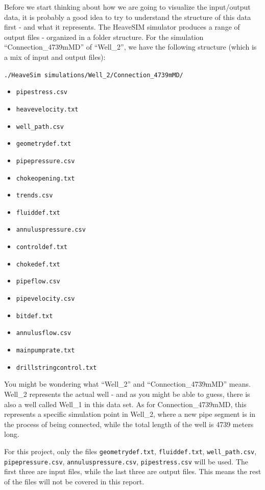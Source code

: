 Before we start thinking about how we are going to visualize the
input/output data, it is probably a good idea to try to understand the
structure of this data first - and what it represents. The HeaveSIM
simulator produces a range of output files - organized in a folder
structure. For the simulation ``Connection\_4739mMD'' of ``Well\_2'', we
have the following structure (which is a mix of input and output files):

\texttt{./HeaveSim\ simulations/Well\_2/Connection\_4739mMD/}

\begin{itemize}
\tightlist
\item
  \texttt{pipestress.csv}
\item
  \texttt{heavevelocity.txt}
\item
  \texttt{well\_path.csv}
\item
  \texttt{geometrydef.txt}
\item
  \texttt{pipepressure.csv}
\item
  \texttt{chokeopening.txt}
\item
  \texttt{trends.csv}
\item
  \texttt{fluiddef.txt}
\item
  \texttt{annuluspressure.csv}
\item
  \texttt{controldef.txt}
\item
  \texttt{chokedef.txt}
\item
  \texttt{pipeflow.csv}
\item
  \texttt{pipevelocity.csv}
\item
  \texttt{bitdef.txt}
\item
  \texttt{annulusflow.csv}
\item
  \texttt{mainpumprate.txt}
\item
  \texttt{drillstringcontrol.txt}
\end{itemize}

You might be wondering what ``Well\_2'' and ``Connection\_4739mMD''
means. Well\_2 represents the actual well - and as you might be able to
guess, there is also a well called Well\_1 in this data set. As for
Connection\_4739mMD, this represents a specific simulation point in
Well\_2, where a new pipe segment is in the process of being connected,
while the total length of the well is 4739 meters long.

For this project, only the files \texttt{geometrydef.txt},
\texttt{fluiddef.txt}, \texttt{well\_path.csv},
\texttt{pipepressure.csv}, \texttt{annuluspressure.csv},
\texttt{pipestress.csv} will be used. The first three are input files,
while the last three are output files. This means the rest of the files
will not be covered in this report.

